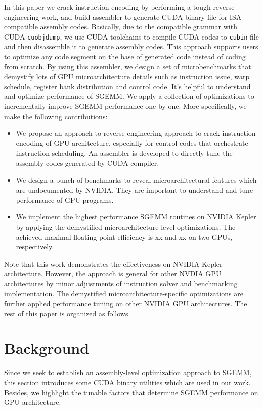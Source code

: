 \documentclass{sig-alternate-05-2015}
\begin{document}
In this paper we crack instruction encoding by performing a tough reverse engineering work, and build assembler to generate CUDA binary file for ISA-compatible assembly codes. Basically, due to the compatible grammar with CUDA {\tt cuobjdump}, we use CUDA toolchains to compile CUDA codes to {\tt cubin} file and then disassemble it to generate assembly codes. This approach supports users to optimize any code segment on the base of generated code instead of coding from scratch. By using this assembler, we design a set of microbenchmarks that demystify lots of GPU microarchitecture details such as instruction issue, warp schedule, register bank distribution and control code. It's helpful to understand and optimize performance of SGEMM. We apply a collection of optimizations to incrementally improve SGEMM performance one by one. More specifically, we make the following contributions:
\begin{itemize}
\item We propose an approach to reverse engineering approach to crack instruction encoding of GPU architecture, especially for control codes that orchestrate instruction scheduling. An assembler is developed to directly tune the assembly codes generated by CUDA compiler.
\item We design a bunch of benchmarks to reveal microarchitectural features which are undocumented by NVIDIA. They are important to understand and tune performance of GPU programs.
\item We implement the highest performance SGEMM routines on NVIDIA Kepler by applying the demystified microarchitecture-level optimizations. The achieved maximal floating-point efficiency is xx and xx on two GPUs, respectively.
\end{itemize}

Note that this work demonstrates the effectiveness on NVIDIA Kepler architecture. However, the approach is general for other NVDIA GPU architectures by minor  adjustments of instruction solver and benchmarking implementation. The demystified microarchitecture-specific optimizations are further applied performance tuning on other NVIDIA GPU architectures. The rest of this paper is organized as follows.
\section{Background}
Since we seek to establish an assembly-level optimization approach to SGEMM, this section introduces some CUDA binary utilities which are used in our work. Besides, we highlight the tunable factors that determine SGEMM performance on GPU architecture.
\end{document}
